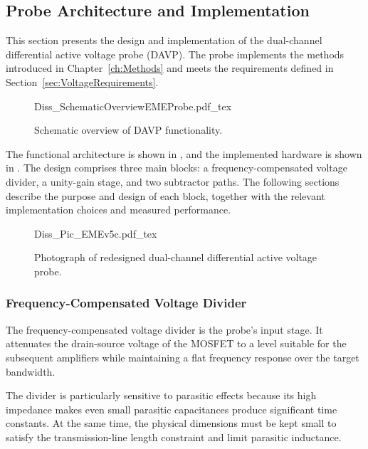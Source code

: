 
\subsection{Probe Architecture and Implementation}
\label{sec:design_voltage}
This section presents the design and implementation of the dual-channel differential active voltage probe (DAVP). The probe implements the methods introduced in Chapter~\ref{ch:Methods} and meets the requirements defined in Section~\ref{sec:VoltageRequirements}.

\begin{figure}[ht]
	\centering
	{Diss_SchematicOverviewEMEProbe.pdf_tex}
	\caption{Schematic overview of DAVP functionality.}\label{fig:OverviewEMEProbe}
\end{figure}


The functional architecture is shown in , and the implemented hardware is shown in . 
The design comprises three main blocks: a frequency-compensated voltage divider, a unity-gain stage, and two subtractor paths. The following sections describe the purpose and design of each block, together with the relevant implementation choices and measured performance.

\begin{figure}[ht]
	\centering
	{Diss_Pic_EMEv5c.pdf_tex}
	\caption{Photograph of redesigned dual-channel differential active voltage probe.}\label{fig:Pic_EMEProbe}
\end{figure}

\FloatBarrier







\subsubsection*{Frequency-Compensated Voltage Divider}
The frequency-compensated voltage divider is the probe's input stage. It attenuates the drain-source voltage of the MOSFET to a level suitable for the subsequent amplifiers while maintaining a flat frequency response over the target bandwidth.

The divider is particularly sensitive to parasitic effects because its high impedance makes even small parasitic capacitances produce significant time constants. At the same time, the physical dimensions must be kept small to satisfy the transmission-line length constraint and limit parasitic inductance. 


